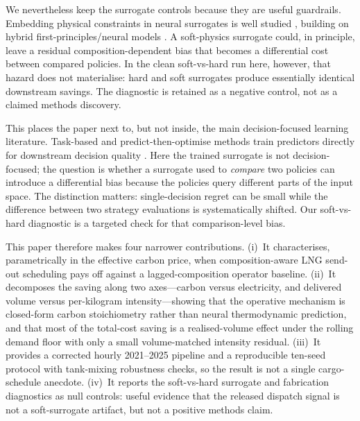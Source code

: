 \documentclass[11pt]{article}
\begin{document}
We nevertheless keep the surrogate controls because they are useful guardrails.
Embedding physical constraints in neural surrogates is well studied
\citep{krishnapriyan2021characterizing,chalapathi2024moe,chen2024kkt}, building
on hybrid first-principles/neural models
\citep{psichogios1992hybrid,lagaris1998ann_pde}. A soft-physics surrogate could,
in principle, leave a residual composition-dependent bias that becomes a
differential cost between compared policies. In the clean soft-vs-hard run here,
however, that hazard does not materialise: hard and soft surrogates produce
essentially identical downstream savings. The diagnostic is retained as a
negative control, not as a claimed methods discovery.

This places the paper next to, but not inside, the main decision-focused
learning literature. Task-based and predict-then-optimise methods train
predictors directly for downstream decision quality
\citep{donti2017task,elmachtoub2022smart,mandi2023decision}. Here the trained
surrogate is not decision-focused; the question is whether a surrogate used to
\emph{compare} two policies can introduce a differential bias because the
policies query different parts of the input space. The distinction matters:
single-decision regret can be small while the difference between two strategy
evaluations is systematically shifted. Our soft-vs-hard diagnostic is a
targeted check for that comparison-level bias.

This paper therefore makes four narrower contributions. (i)~It characterises,
parametrically in the effective carbon price, when composition-aware LNG
send-out scheduling pays off against a lagged-composition operator baseline.
(ii)~It decomposes the saving along two axes---carbon versus electricity, and
delivered volume versus per-kilogram intensity---showing that the operative
mechanism is closed-form carbon stoichiometry rather than neural thermodynamic
prediction, and that most of the total-cost saving is a realised-volume effect
under the rolling demand floor with only a small volume-matched intensity
residual. (iii)~It provides a corrected hourly
2021--2025 pipeline and a reproducible ten-seed protocol with tank-mixing
robustness checks, so the result is not a single cargo-schedule anecdote.
(iv)~It reports the soft-vs-hard surrogate and fabrication diagnostics as null
controls: useful evidence that the released dispatch signal is not a
soft-surrogate artifact, but not a positive methods claim.

\end{document}
